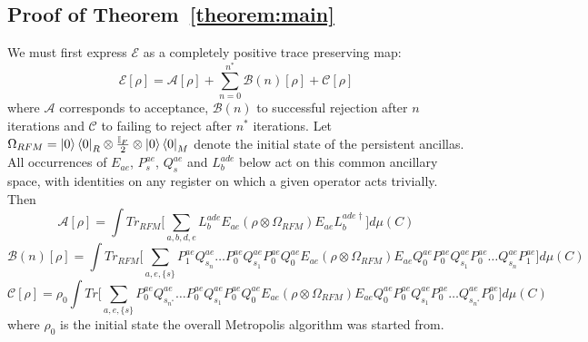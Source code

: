\documentclass[aps,floatfix,10pt,amssymb,amsfont,amsmath,superscriptaddress,float,nofootinbib,longbibliography,nobalancelastpage,twocolumn]{revtex4-2}
\begin{document}
\begin{widetext}
\subsection{Proof of Theorem~\ref{theorem:main}}
We must first express $\mathcal{E}$ as a completely positive trace preserving map:
\begin{equation}
    \mathcal{E}[\rho] = \mathcal{A}[\rho] + \sum_{n=0}^{n^*} \mathcal{B}(n)[\rho] + \mathcal{C}[\rho]
\end{equation}
where $\mathcal{A}$ corresponds to acceptance, $\mathcal{B}(n)$ to successful rejection after $n$ iterations and $\mathcal{C}$ to failing to reject after $n^*$ iterations. Let $\Omega_{RFM} =\ket{0}\bra{0}_R\otimes \frac{\mathbb{I}_F}{2}\otimes\ket{0}\bra{0}_M$ denote the initial state of the persistent ancillas. All occurrences of $E_{ae}$, $P_s^{ae}$, $Q_s^{ae}$ and $L_b^{ade}$ below act on this common ancillary space, with identities on any register on which a given operator acts trivially. Then
\begin{equation}
    \mathcal{A}[\rho] = \int  Tr_{RFM}\bigg[\sum_{a,b,d,e}L_b^{ade} E_{ae} ( \rho\otimes \Omega_{RFM}) 
     E_{ae}L^{ade\dagger}_b\bigg]d\mu(C)
\end{equation}
\begin{equation}
    \mathcal{B}(n)[\rho] = \int Tr_{RFM}\bigg[\sum_{a,e,\{s\}}P^{ae}_1Q^{ae}_{s_n}\ldots P^{ae}_0Q^{ae}_{s_1}P^{ae}_0Q^{ae}_0E_{ae} ( \rho\otimes \Omega_{RFM})E_{ae}Q^{ae}_0P^{ae}_0Q^{ae}_{s_1}P^{ae}_0\ldots Q^{ae}_{s_n}P^{ae}_1\bigg]d\mu(C)
\end{equation}
\begin{equation}
    \mathcal{C}[\rho] = \rho_0 \int Tr\bigg[\sum_{a,e,\{s\}}P^{ae}_0Q^{ae}_{s_{n^*}}\ldots P^{ae}_0Q^{ae}_{s_1}P^{ae}_0Q^{ae}_0E_{ae} ( \rho\otimes \Omega_{RFM})E_{ae}Q^{ae}_0P^{ae}_0Q^{ae}_{s_1}P^{ae}_0\ldots Q^{ae}_{s_{n^*}}P^{ae}_0\bigg]d\mu(C) 
\end{equation}
where $\rho_0$ is the initial state the overall Metropolis algorithm was started from. 


\end{widetext}
\end{document}
